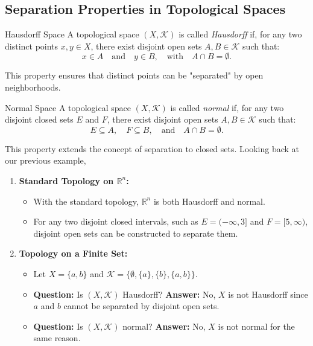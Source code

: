 \subsection{Separation Properties in Topological Spaces}
\begin{defbox}{Hausdorff Space}
A topological space $(X, \mathcal{K})$ is called \textit{Hausdorff} if, for any two distinct points $x, y \in X$, there exist disjoint open sets $A, B \in \mathcal{K}$ such that:
\[
    x \in A \quad \text{and} \quad y \in B, \quad \text{with} \quad A \cap B = \emptyset.
\]
\end{defbox}
This property ensures that distinct points can be "separated" by open neighborhoods.

\begin{defbox}{Normal Space}
A topological space $(X, \mathcal{K})$ is called \textit{normal} if, for any two disjoint closed sets $E$ and $F$, there exist disjoint open sets $A, B \in \mathcal{K}$ such that:
\[
    E \subseteq A, \quad F \subseteq B, \quad \text{and} \quad A \cap B = \emptyset.
\]
\end{defbox}
This property extends the concept of separation to closed sets. Looking back at our previous example,

\begin{enumerate}
    \item \textbf{Standard Topology on $\mathbb{R}^n$:}
    \begin{itemize}
        \item With the standard topology, $\mathbb{R}^n$ is both Hausdorff and normal.
        \item For any two disjoint closed intervals, such as $E = (-\infty, 3]$ and $F = [5, \infty)$, disjoint open sets can be constructed to separate them.
    \end{itemize}

    \item \textbf{Topology on a Finite Set:}
    \begin{itemize}
        \item Let $X = \{ a, b \}$ and $\mathcal{K} = \{ \emptyset, \{ a \}, \{ b \}, \{ a, b \} \}$.
        \item \textbf{Question:} Is $(X, \mathcal{K})$ Hausdorff? \textbf{Answer:} No, $X$ is not Hausdorff since $a$ and $b$ cannot be separated by disjoint open sets.
        \item \textbf{Question:} Is $(X, \mathcal{K})$ normal? \textbf{Answer:} No, $X$ is not normal for the same reason.
    \end{itemize}
\end{enumerate}
